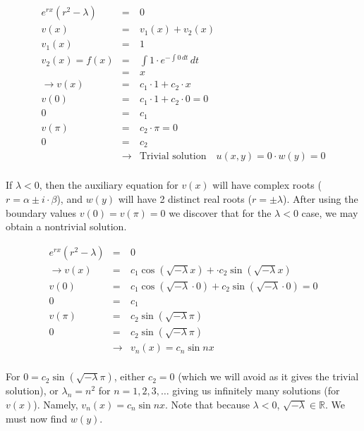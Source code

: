 \documentclass[12pt, a4paper]{article}
\theoremstyle{plain}
\theoremstyle{definition}
\theoremstyle{remark}
\newcommand{\RR}{\mathbb{R}}
\begin{document}
\begin{eqnarray*}
e^{rx}(r^2-\lambda) &=&0 \\
v(x) &=& v_1(x) + v_2(x) \\
v_1(x) &=& 1 \\
v_2(x) =f(x) &=& \int 1 \cdot e^{-\int 0\,dt}\,dt \\
 &=& x \\
\rightarrow v(x) &=& c_1 \cdot1+c_2 \cdot x\\
v(0) &=& c_1 \cdot1+c_2 \cdot 0 = 0\\
0 &=& c_1\\
v(\pi) &=& c_2 \cdot \pi = 0\\
0&=& c_2\\
&\rightarrow& \text{Trivial solution} \quad u(x,y)=0 \cdot w(y) = 0\\
\end{eqnarray*}

\newpage

If $\lambda <0$, then the auxiliary equation for $v(x)$ will have complex roots ($r = \alpha \pm i \cdot \beta$), and $w(y)$ will have 2 distinct real roots ($r = \pm \lambda$). After using the boundary values $v(0)=v(\pi)=0$ we discover that for the $\lambda <0$ case, we may obtain a nontrivial solution.


\begin{eqnarray*}
e^{rx}(r^2-\lambda) &=& 0 \\
\rightarrow v(x) &=& c_1\cos(\sqrt{ -\lambda} x)+ \cdot c_2\sin(\sqrt{ -\lambda} x)\\
v(0) &=& c_1\cos( \sqrt{ -\lambda} \cdot 0)+ c_2\sin( \sqrt{ -\lambda} \cdot 0) = 0\\
0 &=& c_1\\
v(\pi) &=& c_2\sin( \sqrt{ -\lambda} \pi)\\
0 &=& c_2 \sin(\sqrt{ -\lambda} \pi)\\
&\rightarrow& v_n(x) = c_n\sin{nx} \\
\end{eqnarray*}

For $0 = c_2\sin(\sqrt{ -\lambda} \pi)$, either $c_2=0$ (which we will avoid as it gives the trivial solution), or $\lambda_n = n^2$ for $ n = 1, 2, 3, \ldots$ giving us infinitely many solutions (for $v(x)$). Namely, $v_n(x) = c_n\sin{nx}$. Note that because $\lambda <0$, $ \sqrt{ -\lambda} \in \RR$. We must now find $w(y)$.
\end{document}
